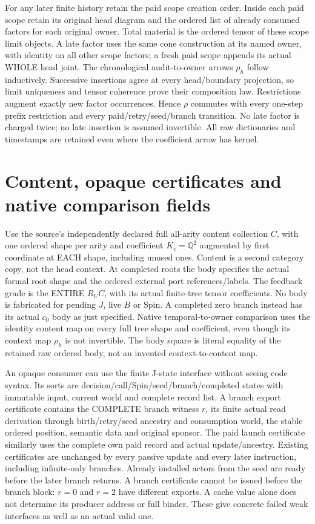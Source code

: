 \documentclass[11pt]{article}
\begin{document}
For any later finite history retain the paid scope creation order. Inside each paid scope retain its original head diagram and the ordered list of already consumed factors for each original owner. Total material is the ordered tensor of these scope limit objects. A late factor uses the same cone construction at its named owner, with identity on all other scope factors; a fresh paid scope appends its actual WHOLE head joint. The chronological audit-to-owner arrows $\rho_h$ follow inductively. Successive insertions agree at every head/boundary projection, so limit uniqueness and tensor coherence prove their composition law. Restrictions augment exactly new factor occurrences. Hence $\rho$ commutes with every one-step prefix restriction and every paid/retry/seed/branch transition. No late factor is charged twice; no late insertion is assumed invertible. All raw dictionaries and timestamps are retained even where the coefficient arrow has kernel.

\section{Content, opaque certificates and native comparison fields}
Use the source's independently declared full all-arity content collection $C$, with one ordered shape per arity and coefficient $K_c=\mathbb Q^2$ augmented by first coordinate at EACH shape, including unused ones. Content is a second category copy, not the head context. At completed roots the body specifies the actual formal root shape and the ordered external port references/labels. The feedback grade is the ENTIRE $R_UC$, with its actual finite-tree tensor coefficients. No body is fabricated for pending $J$, live $B$ or Spin. A completed zero branch instead has its actual $c_0$ body as just specified. Native temporal-to-owner comparison uses the identity content map on every full tree shape and coefficient, even though its context map $\rho_h$ is not invertible. The body square is literal equality of the retained raw ordered body, not an invented context-to-content map.

An opaque consumer can use the finite J-state interface without seeing code syntax. Its sorts are decision/call/Spin/seed/branch/completed states with immutable input, current world and complete record list. A branch export certificate contains the COMPLETE branch witness $r$, its finite actual read derivation through birth/retry/seed ancestry and consumption world, the stable ordered position, semantic data and original sponsor. The paid launch certificate similarly uses the complete own paid record and actual update/ancestry. Existing certificates are unchanged by every passive update and every later instruction, including infinite-only branches. Already installed actors from the seed are ready before the later branch returns. A branch certificate cannot be issued before the branch block: $r=0$ and $r=2$ have different exports. A cache value alone does not determine its producer address or full binder. These give concrete failed weak interfaces as well as an actual valid one.
\end{document}

